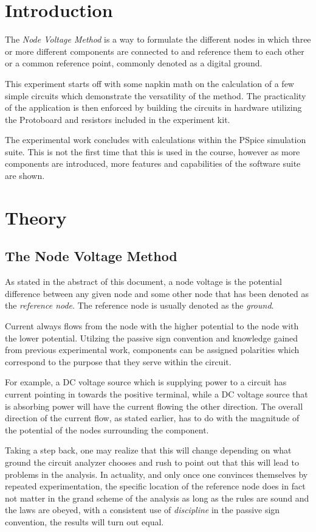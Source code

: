 \documentclass[12pt]{article}
\begin{document}
\section*{Introduction}
The \textit{Node Voltage Method} is a way to formulate the different nodes in
which three or more different components are connected to and reference them to
each other or a common reference point, commonly denoted as a digital ground.

This experiment starts off with some napkin math on the calculation of a few
simple circuits which demonstrate the versatility of the method. The
practicality of the application is then enforced by building the circuits in
hardware utilizing the Protoboard and resistors included in the experiment kit.

The experimental work concludes with calculations within the PSpice simulation
suite. This is not the first time that this is used in the course, however as
more components are introduced, more features and capabilities of the software
suite are shown.
\section*{Theory}
\subsection*{The Node Voltage Method}
As stated in the abstract of this document, a node voltage is the potential
difference between any given node and some other node that has been denoted as
the \textit{reference node}. The reference node is usually denoted as the
\textit{ground}.

Current always flows from the node with the higher potential to the node with
the lower potential. Utilzing the passive sign convention and knowledge gained
from previous experimental work, components can be assigned polarities which
correspond to the purpose that they serve within the circuit.

For example, a DC voltage source which is supplying power to a circuit has
current pointing in towards the positive terminal, while a DC voltage source
that is absorbing power will have the current flowing the other direction. The
overall direction of the current flow, as stated earlier, has to do with the
magnitude of the potential of the nodes surrounding the component.

Taking a step back, one may realize that this will change depending on what
ground the circuit analyzer chooses and rush to point out that this will lead to
problems in the analysis. In actuality, and only once one convinces themselves
by repeated experimentation, the specific location of the reference node does in
fact not matter in the grand scheme of the analysis as long as the rules are sound
and the laws are obeyed, with a consistent use of \textit{discipline} in the
passive sign convention, the results will turn out equal.
\end{document}
